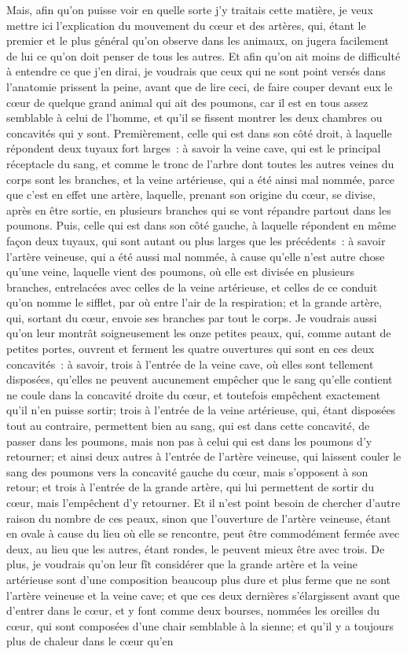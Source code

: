 \documentclass[french,twoside]{book} %
\begin{document}
Mais, afin qu'on puisse voir en quelle sorte j'y traitais cette matière, je veux mettre ici l'explication du mouvement du cœur et des artères, qui, étant le premier et le plus général qu'on observe dans les animaux, on jugera facilement de lui ce qu'on doit penser de tous les autres. Et afin qu'on ait moins de difficulté à entendre ce que j'en dirai, je voudrais que ceux qui ne sont point versés dans l'anatomie prissent la peine, avant que de lire ceci, de faire couper devant eux le cœur de quelque grand animal qui ait des poumons, car il est en tous assez semblable à celui de l'homme, et qu'il se fissent montrer les deux chambres ou concavités qui y sont. Premièrement, celle qui est dans son côté droit, à laquelle répondent deux tuyaux fort larges : à savoir la veine cave, qui est le principal réceptacle du sang, et comme le tronc de l'arbre dont toutes les autres veines du corps sont les branches, et la veine artérieuse, qui a été ainsi mal nommée, parce que c'est en effet une artère, laquelle, prenant son origine du cœur, se divise, après en être sortie, en plusieurs branches qui se vont répandre partout dans les poumons. Puis, celle qui est dans son côté gauche, à laquelle répondent en même façon deux tuyaux, qui sont autant ou plus larges que les précédents : à savoir l'artère veineuse, qui a été aussi mal nommée, à cause qu'elle n'est autre chose qu'une veine, laquelle vient des poumons, où elle est divisée en plusieurs branches, entrelacées avec celles de la veine artérieuse, et celles de ce conduit qu'on nomme le sifflet, par où entre l'air de la respiration; et la grande artère, qui, sortant du cœur, envoie ses branches par tout le corps. Je voudrais aussi qu'on leur montrât soigneusement les onze petites peaux, qui, comme autant de petites portes, ouvrent et ferment les quatre ouvertures qui sont en ces deux concavités : à savoir, trois à l'entrée de la veine cave, où elles sont tellement disposées, qu'elles ne peuvent aucunement empêcher que le sang qu'elle contient ne coule dans la concavité droite du cœur, et toutefois empêchent exactement qu'il n'en puisse sortir; trois à l'entrée de la veine artérieuse, qui, étant disposées tout au contraire, permettent bien au sang, qui est dans cette concavité, de passer dans les poumons, mais non pas à celui qui est dans les poumons d'y retourner; et ainsi deux autres à l'entrée de l'artère veineuse, qui laissent couler le sang des poumons vers la concavité gauche du cœur, mais s'opposent à son retour; et trois à l'entrée de la grande artère, qui lui permettent de sortir du cœur, mais l'empêchent d'y retourner. Et il n'est point besoin de chercher d'autre raison du nombre de ces peaux, sinon que l'ouverture de l'artère veineuse, étant en ovale à cause du lieu où elle se rencontre, peut être commodément fermée avec deux, au lieu que les autres, étant rondes, le peuvent mieux être avec trois. De plus, je voudrais qu'on leur fît considérer que la grande artère et la veine artérieuse sont d'une composition beaucoup plus dure et plus ferme que ne sont l'artère veineuse et la veine cave; et que ces deux dernières s'élargissent avant que d'entrer dans le cœur, et y font comme deux bourses, nommées les oreilles du cœur, qui sont composées d'une chair semblable à la sienne; et qu'il y a toujours plus de chaleur dans le cœur qu'en 
\end{document}
